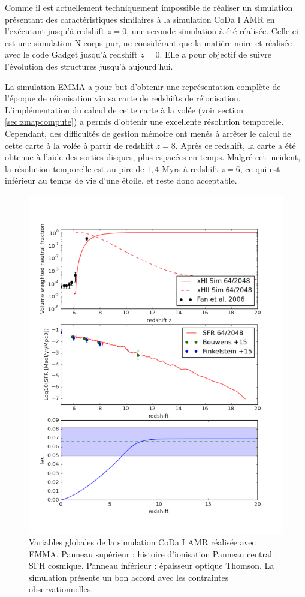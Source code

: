 Comme il est actuellement techniquement impossible de réaliser un simulation présentant des caractéristiques similaires à la simulation \ac{CoDa} I \ac{AMR} en l'exécutant jusqu’à redshift $z=0$, une seconde simulation à été réalisée.
Celle-ci est une simulation N-corps pur, ne considérant que la matière noire et réalisée avec le code Gadget \citep{springel_cosmological_2005} jusqu'à redshift $z=0$.
Elle a pour objectif de suivre l'évolution des structures jusqu'à aujourd'hui.

La simulation EMMA a pour but d'obtenir une représentation complète de l'époque de réionisation via sa carte de redshifts de réionisation.
L'implémentation du calcul de cette carte à la volée (voir section \ref{sec:zmapcompute}) a permis d'obtenir une excellente résolution temporelle.
Cependant, des difficultés de gestion mémoire ont menés à arrêter le calcul de cette carte à la volée à partir de redshift $z=8$.
Après ce redshift, la carte a été obtenue à l'aide des sorties disques, plus espacées en temps.
Malgré cet incident, la résolution temporelle est au pire de $1,4$ Myrs à redshift $z=6$, ce qui est inférieur au temps de vie d'une étoile, et reste donc acceptable.


\begin{figure}
        \includegraphics[width=.95\linewidth]{img/05/x_sfr_tau.pdf} 
        \caption[Contraintes CoDa I AMR]{ Variables globales de la simulation \ac{CoDa} I \ac{AMR} réalisée avec EMMA.
        Panneau supérieur : histoire d'ionisation
		Panneau central : SFH cosmique.
        Panneau inférieur : épaisseur optique Thomson.
        La simulation présente un bon accord avec les contraintes observationnelles.
		\label{fig:presCODAEMMA}}
\end{figure}


